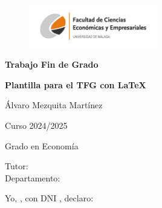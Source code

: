 \documentclass[12pt,a4paper]{report}
\numberwithin{figure}{section} %
\numberwithin{table}{section} %
\begin{document}
\begin{titlepage}
    \centering 
    \begin{figure}[h!]
        \centering
        \includegraphics[width=0.5\textwidth]{logo.png}
    \end{figure}
    
    \vspace*{1cm} 
    \Huge
    \textbf{Trabajo Fin de Grado}
    \vspace*{1cm}
    
    \Huge
    
    \textbf{Plantilla para el TFG con \LaTeX}
    
    \vspace{0.5cm}
    \LARGE 
    Álvaro Mezquita Martínez
    \vspace{0.5cm} 

    Curso 2024/2025
        
    \vspace{0.5cm}

    Grado en Economía
    
    \vfill

    \raggedleft     
    Tutor:  \makebox[5cm]{\dotfill} %
    \\
    Departamento:  \makebox[5cm]{\dotfill} %
    
    \vspace{5cm}
\end{titlepage}


\newpage
\thispagestyle{empty} %

\vspace{12pt}

Yo, \makebox[2cm]{\dotfill}, con DNI  \makebox[2cm]{\dotfill}, declaro:  %

\vspace{12pt}
\end{document}
